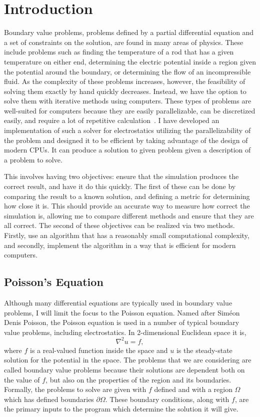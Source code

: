 \section{Introduction}

Boundary value problems, problems defined by a partial differential equation and a set of
constraints on the solution, are found in many areas of physics. These include problems
such as finding the temperature of a rod that has a given temperature on either end,
determining the electric potential inside a region given the potential around the
boundary, or determining the flow of an incompressible fluid. As the complexity of 
these problems increases, however, the feasibility of solving them exactly by hand
quickly decreases. Instead, we have the option to solve them with iterative methods
using computers. These types of problems are well-suited for computers because
they are easily parallelizable, can be discretized easily, and require a lot of repetitive calculation~\cite{parallel}. I have developed an
implementation of such a solver for electrostatics utilizing the 
parallelizability of the problem and designed it to be efficient by taking advantage 
of the design of modern CPUs. It can produce a solution to given problem given a description
of a problem to solve.

This involves having two objectives: ensure that the simulation produces the correct
result, and have it do this quickly. The first of these can be done by comparing the
result to a known solution, and defining a metric for determining how close it is.
This should provide an accurate way to measure how correct the simulation is, allowing
me to compare different methods and ensure that they are all correct.
The second of these objectives can be realized via two methods. Firstly, use an
algorithm that has a reasonably small computational complexity, and secondly,
implement the algorithm in a way that is efficient for modern computers.

\subsection{Poisson's Equation}

Although many differential equations are typically used in boundary value problems,
I will limit the focus to the Poisson equation. Named after Siméon Denis Poisson, the Poisson equation
is used in a number of typical boundary value problems, including electrostatics.
In 2-dimensional Euclidean space it is\cite{boas},
$$\nabla^2 u = f,$$
where $f$ is a real-valued function inside the space and $u$ is the steady-state
solution for the potential in the space. The problems that we are considering are called boundary value problems
because their solutions are dependent both on the value of $f$, but also on the properties of the region and its boundaries.
Formally, the problems to solve are given with $f$ defined and with a region $\Omega$ which has defined boundaries
$\partial\Omega$. These boundary conditions, along with $f$, are the primary inputs to the program which determine
the solution it will give.

